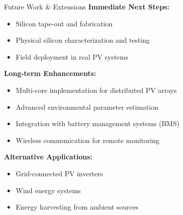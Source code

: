 \documentclass[aspectratio=169,usenames,dvipsnames]{beamer}
\begin{document}
\begin{frame}{Future Work \& Extensions}
    \textbf{Immediate Next Steps:}
    \begin{itemize}
        \item Silicon tape-out and fabrication
        \item Physical silicon characterization and testing
        \item Field deployment in real PV systems
    \end{itemize}
    
    \vspace{0.3cm}
    \textbf{Long-term Enhancements:}
    \begin{itemize}
        \item Multi-core implementation for distributed PV arrays
        \item Advanced environmental parameter estimation
        \item Integration with battery management systems (BMS)
        \item Wireless communication for remote monitoring
    \end{itemize}
    
    \vspace{0.3cm}
    \textbf{Alternative Applications:}
    \begin{itemize}
        \item Grid-connected PV inverters
        \item Wind energy systems
        \item Energy harvesting from ambient sources
    \end{itemize}
\end{frame}
\end{document}

